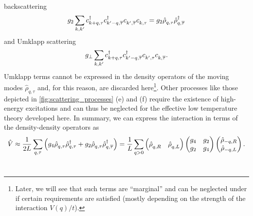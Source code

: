 backscattering
\begin{align}
    g_2\sum_{k,k'}c^\dag_{k+q,\tau}c^\dag_{k'-q,\overline\tau}c^\pdag_{k',\overline\tau}c^\pdag_{k,\tau} = g_2 \hat\rho^\pdag_{q,\tau}\hat\rho^\dag_{q,\overline\tau}
\end{align}
and Umklapp scattering
\begin{align}
    g_\perp\sum_{k,k'} c^\dag_{k+q,\tau}c^\dag_{k'-q,\overline\tau}c^\pdag_{k',\tau}c^\pdag_{k,\overline\tau}.
\end{align}
Umklapp terms cannot be expressed in the density operators of the moving modes $\hat\rho_{q,\tau}$ and, for this reason, are discarded here\footnote{Later, we will see that such terms are ``marginal'' and can be neglected under if certain requirements are satisfied (mostly depending on the strength of the interaction $V(q)/t$).}.
Other processes like those depicted in \cref{fig:scattering_processes} (e) and (f) require the existence of high-energy excitations and can thus be neglected for the effective low temperature theory developed here.
In summary, we can express the interaction in terms of the density-density operators as
\begin{align}
    \hat V \approx \frac{1}{2L}\sum_{q,\tau}\brlr{g_4\hat\rho^\pdag_{q,\tau}\hat\rho^\dag_{q,\tau} + g_2\hat\rho^\pdag_{q,\tau}\hat\rho^\dag_{q,\overline\tau}}
    =
    \frac{1}{L}\sum_{q>0}
    \begin{pmatrix}
        \hat\rho^\pdag_{q,R} & \hat\rho^\pdag_{q,L}
    \end{pmatrix}
    \begin{pmatrix}
        g_4 & g_2 \\
        g_2 & g_4
    \end{pmatrix}
    \begin{pmatrix}
        \hat\rho_{-q,R} \\ \hat\rho_{-q,L}
    \end{pmatrix}
    .
    \label{eq:interaction_densities}
\end{align}
\\

